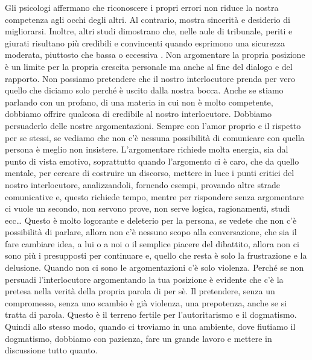 \documentclass[12pt]{book} %
\begin{document}
Gli psicologi affermano che riconoscere i propri errori non riduce la nostra competenza agli occhi degli altri. Al contrario, mostra sincerità e desiderio di migliorarsi. Inoltre, altri studi dimostrano che, nelle aule di tribunale, periti e giurati risultano più credibili e convincenti quando esprimono una sicurezza moderata, piuttosto che bassa o eccessiva .
Non argomentare la propria posizione è un limite per la propria crescita personale ma anche al fine del
dialogo e del rapporto. Non possiamo pretendere che il nostro interlocutore prenda per vero quello che diciamo solo perché è uscito
dalla nostra bocca. Anche se stiamo parlando con un profano, di una materia in cui non è molto competente, dobbiamo
offrire qualcosa di credibile al nostro interlocutore. Dobbiamo persuaderlo delle nostre argomentazioni. Sempre con
l'amor proprio e il rispetto per se stessi, se vediamo che non c'è nessuna
possibilità di comunicare con quella persona è meglio non insistere. L'argomentare richiede molta
energia, sia dal punto di vista emotivo, soprattutto quando l'argomento ci è caro, che da quello
mentale, per cercare di costruire un discorso, mettere in luce i punti critici del nostro interlocutore, analizzandoli,
fornendo esempi, provando altre strade comunicative e, questo richiede tempo, mentre per rispondere senza argomentare ci vuole
un secondo, non servono prove, non serve logica, ragionamenti, studi ecc… Questo è molto logorante e deleterio per la
persona, se vedete che non c'è possibilità di parlare, allora non c'è nessuno
scopo alla conversazione, che sia il fare cambiare idea, a lui o a noi o il semplice piacere del dibattito, allora non ci sono più i
presupposti per continuare e, quello che resta è solo la frustrazione e la delusione. 
Quando non ci sono le argomentazioni c'è solo violenza. Perché se non persuadi
l'interlocutore argomentando la tua posizione è evidente che c'è la pretesa
nella verità della propria parola di per sè. Il pretendere, senza un compromesso, senza uno scambio è già violenza, una
prepotenza, anche se si tratta di parola. Questo è il terreno fertile per
l'autoritarismo e il dogmatismo. Quindi allo stesso modo, quando ci troviamo in una ambiente, dove
fiutiamo il dogmatismo, dobbiamo con pazienza, fare un grande lavoro e mettere in discussione tutto quanto. 
\end{document}

